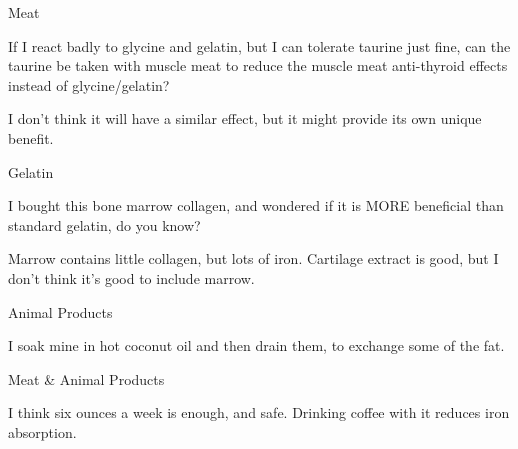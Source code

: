 \documentclass[11pt,oneside,openany,extrafontsizes]{memoir}
\begin{document}
\begin{qaexchange}{Meat}

    \begin{question}
        If I react badly to glycine and gelatin, but I can tolerate taurine just fine, can the taurine be taken with muscle meat to reduce the muscle meat anti-thyroid effects instead of glycine/gelatin?
    \end{question}

    \begin{answer}
        I don't think it will have a similar effect, but it might provide its own unique benefit.
    \end{answer}
\end{qaexchange}

\begin{qaexchange}{Gelatin}

    \begin{question}
        I bought this bone marrow collagen, and wondered if it is MORE beneficial than standard gelatin, do you know?
    \end{question}

    \begin{answer}
        Marrow contains little collagen, but lots of iron. Cartilage extract is good, but I don't think it's good to include marrow.
    \end{answer}
\end{qaexchange}

\begin{standalonequote}{Animal Products}

    \begin{answer}
      I soak mine in hot coconut oil and then drain them, to exchange some of the fat.
    \end{answer}
\end{standalonequote}

\begin{standalonequote}{Meat \& Animal Products}

    \begin{answer}
      I think six ounces a week is enough, and safe. Drinking coffee with it reduces iron absorption.
    \end{answer}
\end{standalonequote}
\end{document}
